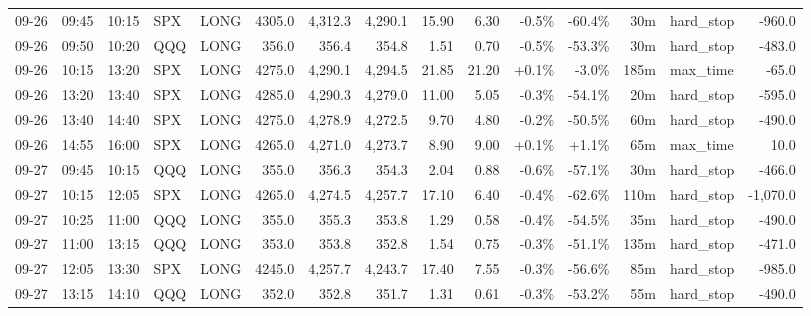 \documentclass[11pt,a4paper,twoside]{article}
\begin{document}
\begin{landscape}
\begin{center}
\begin{longtable}{>{\color{txtmain}}l l l l l r r r r r r r r >{\color{txtmain}}l r}
09-26 & 09:45 & 10:15 & SPX & LONG & 4305.0 & 4,312.3 & 4,290.1 & 15.90 & 6.30 & \textcolor{lossred}{-0.5\%} & \textcolor{lossred}{-60.4\%} & 30m & hard\_stop & \textcolor{lossred}{-960.0} \\
09-26 & 09:50 & 10:20 & QQQ & LONG & 356.0 & 356.4 & 354.8 & 1.51 & 0.70 & \textcolor{lossred}{-0.5\%} & \textcolor{lossred}{-53.3\%} & 30m & hard\_stop & \textcolor{lossred}{-483.0} \\
09-26 & 10:15 & 13:20 & SPX & LONG & 4275.0 & 4,290.1 & 4,294.5 & 21.85 & 21.20 & \textcolor{wingreen}{+0.1\%} & \textcolor{lossred}{-3.0\%} & 185m & max\_time & \textcolor{lossred}{-65.0} \\
09-26 & 13:20 & 13:40 & SPX & LONG & 4285.0 & 4,290.3 & 4,279.0 & 11.00 & 5.05 & \textcolor{lossred}{-0.3\%} & \textcolor{lossred}{-54.1\%} & 20m & hard\_stop & \textcolor{lossred}{-595.0} \\
09-26 & 13:40 & 14:40 & SPX & LONG & 4275.0 & 4,278.9 & 4,272.5 & 9.70 & 4.80 & \textcolor{lossred}{-0.2\%} & \textcolor{lossred}{-50.5\%} & 60m & hard\_stop & \textcolor{lossred}{-490.0} \\
09-26 & 14:55 & 16:00 & SPX & LONG & 4265.0 & 4,271.0 & 4,273.7 & 8.90 & 9.00 & \textcolor{wingreen}{+0.1\%} & \textcolor{wingreen}{+1.1\%} & 65m & max\_time & \textcolor{wingreen}{10.0} \\
09-27 & 09:45 & 10:15 & QQQ & LONG & 355.0 & 356.3 & 354.3 & 2.04 & 0.88 & \textcolor{lossred}{-0.6\%} & \textcolor{lossred}{-57.1\%} & 30m & hard\_stop & \textcolor{lossred}{-466.0} \\
09-27 & 10:15 & 12:05 & SPX & LONG & 4265.0 & 4,274.5 & 4,257.7 & 17.10 & 6.40 & \textcolor{lossred}{-0.4\%} & \textcolor{lossred}{-62.6\%} & 110m & hard\_stop & \textcolor{lossred}{-1,070.0} \\
09-27 & 10:25 & 11:00 & QQQ & LONG & 355.0 & 355.3 & 353.8 & 1.29 & 0.58 & \textcolor{lossred}{-0.4\%} & \textcolor{lossred}{-54.5\%} & 35m & hard\_stop & \textcolor{lossred}{-490.0} \\
09-27 & 11:00 & 13:15 & QQQ & LONG & 353.0 & 353.8 & 352.8 & 1.54 & 0.75 & \textcolor{lossred}{-0.3\%} & \textcolor{lossred}{-51.1\%} & 135m & hard\_stop & \textcolor{lossred}{-471.0} \\
09-27 & 12:05 & 13:30 & SPX & LONG & 4245.0 & 4,257.7 & 4,243.7 & 17.40 & 7.55 & \textcolor{lossred}{-0.3\%} & \textcolor{lossred}{-56.6\%} & 85m & hard\_stop & \textcolor{lossred}{-985.0} \\
09-27 & 13:15 & 14:10 & QQQ & LONG & 352.0 & 352.8 & 351.7 & 1.31 & 0.61 & \textcolor{lossred}{-0.3\%} & \textcolor{lossred}{-53.2\%} & 55m & hard\_stop & \textcolor{lossred}{-490.0} \\

\end{longtable}
\end{center}
\end{landscape}
\end{document}
